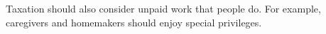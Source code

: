 Taxation should also consider unpaid work that people do.
For example, caregivers and homemakers should enjoy special privileges.